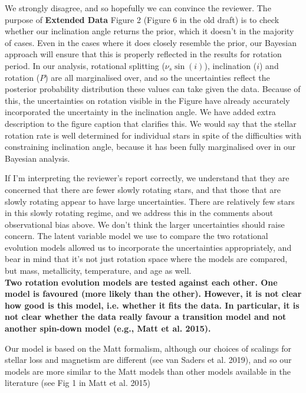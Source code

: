 \documentclass[11pt]{article}
\begin{document}
We strongly disagree, and so hopefully we can convince the reviewer. The purpose of \textbf{Extended Data} Figure 2 (Figure 6 in the old draft) is to check whether our inclination angle returns the prior, which it doesn’t in the majority of cases. Even in the cases where it does closely resemble the prior, our Bayesian approach will ensure that this is properly reflected in the results for rotation period. In our analysis, rotational splitting ($\nu_{s}\sin(i)$), inclination ($i$) and rotation ($P$) are all marginalised over, and so the uncertainties reflect the posterior probability distribution these values can take given the data. Because of this, the uncertainties on rotation visible in the Figure have already accurately incorporated the uncertainty in the inclination angle. We have added extra description to the figure caption that clarifies this. We would say that the stellar rotation rate is well determined for individual stars in spite of the difficulties with constraining inclination angle, because it has been fully marginalised over in our Bayesian analysis.

If I’m interpreting the reviewer’s report correctly, we understand that they are concerned that there are fewer slowly rotating stars, and that those that are slowly rotating appear to have large uncertainties. There are relatively few stars in this slowly rotating regime, and we address this in the comments about observational bias above. We don’t think the larger uncertainties should raise concern. The latent variable model we use to compare the two rotational evolution models allowed us to incorporate the uncertainties appropriately, and bear in mind that it’s not just rotation space where the models are compared, but mass, metallicity, temperature, and age as well.\\

\noindent\textbf{ Two rotation evolution models are tested against each other. One model is favoured (more likely than the other). However, it is not clear how good is this model, i.e. whether it fits the data. In particular, it is not clear whether the data really favour a transition model and not another spin-down model (e.g., Matt et al. 2015).}

Our model is based on the Matt formalism, although our choices of scalings for stellar loss and magnetism are different (see van Saders et al. 2019), and so our models are more similar to the Matt models than other models available in the literature (see Fig 1 in Matt et al. 2015) 
\end{document}
